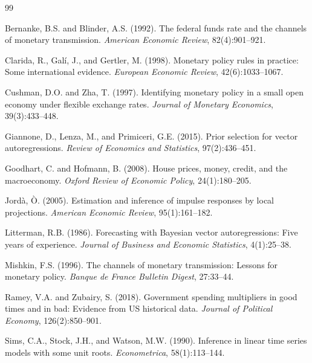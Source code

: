 \documentclass[12pt,a4paper]{article}
\begin{document}
\begin{thebibliography}{99}

Bernanke, B.S. and Blinder, A.S. (1992).
\newblock The federal funds rate and the channels of monetary transmission.
\newblock \textit{American Economic Review}, 82(4):901--921.

Clarida, R., Gal{\'i}, J., and Gertler, M. (1998).
\newblock Monetary policy rules in practice: Some international evidence.
\newblock \textit{European Economic Review}, 42(6):1033--1067.

Cushman, D.O. and Zha, T. (1997).
\newblock Identifying monetary policy in a small open economy under flexible exchange rates.
\newblock \textit{Journal of Monetary Economics}, 39(3):433--448.

Giannone, D., Lenza, M., and Primiceri, G.E. (2015).
\newblock Prior selection for vector autoregressions.
\newblock \textit{Review of Economics and Statistics}, 97(2):436--451.

Goodhart, C. and Hofmann, B. (2008).
\newblock House prices, money, credit, and the macroeconomy.
\newblock \textit{Oxford Review of Economic Policy}, 24(1):180--205.

Jord\`{a}, \`{O}. (2005).
\newblock Estimation and inference of impulse responses by local projections.
\newblock \textit{American Economic Review}, 95(1):161--182.

Litterman, R.B. (1986).
\newblock Forecasting with Bayesian vector autoregressions: Five years of experience.
\newblock \textit{Journal of Business and Economic Statistics}, 4(1):25--38.

Mishkin, F.S. (1996).
\newblock The channels of monetary transmission: Lessons for monetary policy.
\newblock \textit{Banque de France Bulletin Digest}, 27:33--44.

Ramey, V.A. and Zubairy, S. (2018).
\newblock Government spending multipliers in good times and in bad: Evidence
from US historical data.
\newblock \textit{Journal of Political Economy}, 126(2):850--901.

Sims, C.A., Stock, J.H., and Watson, M.W. (1990).
\newblock Inference in linear time series models with some unit roots.
\newblock \textit{Econometrica}, 58(1):113--144.

\end{thebibliography}
\end{document}
